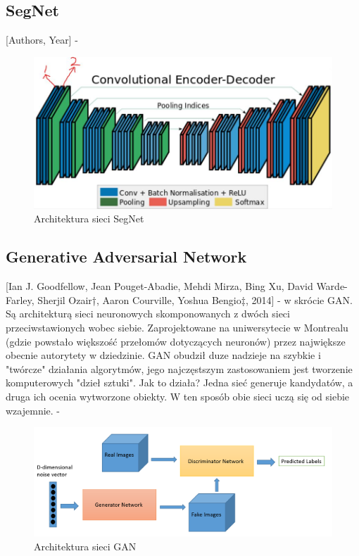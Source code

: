 \documentclass[12pt,a4paper,twoside,titlepage,openright]{book}
\begin{document}
{\subsection{SegNet}
[Authors, Year] - \cite{DBLP:journals/corr/BadrinarayananH15}
\begin{figure}[h]
	\centering
			\includegraphics[resolution=120]{SegNet.png}
		\caption{Architektura sieci SegNet}
\end{figure}

\subsection{Generative Adversarial Network}
[Ian J. Goodfellow, Jean Pouget-Abadie, Mehdi Mirza, Bing Xu, David Warde-Farley, Sherjil Ozair†, Aaron Courville, Yoshua Bengio‡, 2014] - w skrócie GAN. Są architekturą sieci neuronowych skomponowanych z dwóch sieci przeciwstawionych wobec siebie. Zaprojektowane na uniwersytecie w Montrealu (gdzie powstało większość przełomów dotyczących neuronów) przez największe obecnie autorytety w dziedzinie. GAN obudził duze nadzieje na szybkie i "twórcze" działania algorytmów, jego najczęstszym zastosowaniem jest tworzenie komputerowych "dzieł sztuki". Jak to działa? Jedna sieć generuje kandydatów, a druga ich ocenia wytworzone obiekty. W ten sposób obie sieci uczą się od siebie wzajemnie. - \cite{NIPS2014_5423}
\begin{figure}[h]
	\centering
			\includegraphics[resolution=120]{GAN.png}
		\caption{Architektura sieci GAN}
\end{figure}


}
\end{document}
